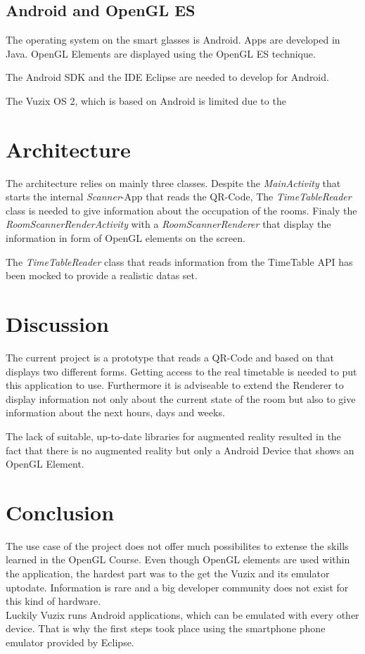 \documentclass[11pt]{scrartcl}
\begin{document}
\begin{multicols}{2}
		\subsection{Android and OpenGL ES}
			The operating system on the smart glasses is Android. Apps are developed in Java. OpenGL Elements are displayed using the OpenGL ES technique.
	
			The Android SDK and the IDE Eclipse are needed to develop for Android.
			
			The Vuzix OS 2, which is based on Android is limited due to the 
	\section{Architecture}
		The architecture relies on mainly three classes. Despite the \emph{MainActivity} that starts the internal \emph{Scanner}-App that reads the QR-Code, The \emph{TimeTableReader} class is needed to give information about the occupation of the rooms. Finaly the \emph{RoomScannerRenderActivity} with a \emph{RoomScannerRenderer} that display the information in form of OpenGL elements on the screen.
		
		The \emph{TimeTableReader} class that reads information from the TimeTable API has been mocked to provide a realistic datas set. 
	
	\section{Discussion}
		The current project is a prototype that reads a QR-Code and based on that displays two different forms. Getting access to the real timetable is needed to put this application to use. Furthermore it is adviseable to extend the Renderer to display information not only about the current state of the room but also to give information about the next hours, days and weeks.
		
		The lack of suitable, up-to-date libraries for augmented reality resulted in the fact that there is no augmented reality but only a Android Device that shows an \linebreak OpenGL Element.  

	\section{Conclusion}
		The use case of the project does not offer much possibilites to extense the skills learned in the OpenGL Course. Even \linebreak though OpenGL elements are used within the application, the hardest part was to the get the Vuzix and its emulator uptodate. Information is rare and a big developer community does not exist for this kind of hardware. \\
		Luckily Vuzix runs Android applications, which can be emulated with every other device. That is why the first steps took place using the smartphone phone emulator provided by Eclipse. \\

\end{multicols}
\end{document}
